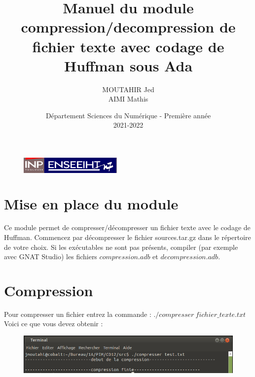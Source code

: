 \documentclass[frenchb]{article}
\begin{document}
\begin{figure}[t]
\centering
\includegraphics[width=5cm]{inp_n7.png}
\end{figure}

\title{\vspace{4cm} \textbf{Manuel du module compression/decompression de fichier texte avec codage de Huffman sous Ada}}
\author{MOUTAHIR Jed\\AIMI Mathis }
\date{\vspace{7cm} Département Sciences du Numérique - Première année \\
2021-2022 }

\maketitle

\newpage
\tableofcontents

\newpage
\section{Mise en place du module}
Ce module permet de compresser/décompresser un fichier texte avec le codage de Huffman. Commencez par décompresser le fichier sources.tar.gz dans le répertoire de votre choix. Si les exécutables ne sont pas présents, compiler (par exemple avec GNAT Studio) les fichiers $compression.adb$ et $decompression.adb$.

\section{Compression}
	Pour compresser un fichier entrez la commande : $./compresser \ fichier\_texte.txt$\\
	Voici ce que vous devez obtenir :
	\begin{figure}[ht!]
		\centering
		\includegraphics[scale=0.7]{compression.png} 
	\end{figure}
		
\end{document}

